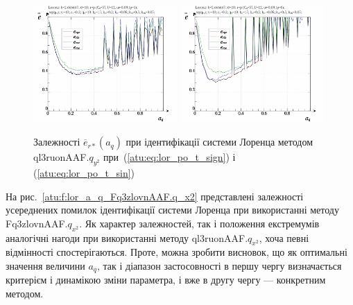 \begin{figure}[ht!]
  \centerline{
    \includegraphics[width=0.49\textwidth]{p/cha/lor/ql3ruonAAF/lor_ql3ruonAAF_qy2-p_a_q_e_sign.png}
    \hfill
    \includegraphics[width=0.49\textwidth]{p/cha/lor/ql3ruonAAF/lor_ql3ruonAAF_qy2-p_a_q_e_sin.png}
  }
\caption{Залежності $ \overline{e}_{r *} (a_q) $ при ідентифікації системи Лоренца методом ql3ruonAAF.$q_{y^2} $ при~(\ref{atu:eq:lor_po_t_sign}) і (\ref{atu:eq:lor_po_t_sin})}
  \label{atu:f:lor_a_q_ql3ruonAAF.q_y2}
\end{figure}


На рис.~\ref{atu:f:lor_a_q_Fq3zlovnAAF.q_x2} представлені залежності усереднених
помилок ідентифікації системи Лоренца при використанні методу
Fq3zlovnAAF.$q_{x^2}$.
Як характер залежностей, так і положення екстремумів аналогічні
нагоди при використанні методу
ql3ruonAAF.$q_{x^2}$,
хоча певні відмінності спостерігаються. Проте, можна зробити
висновок, що як оптимальні значення величини
$a_q$, так і діапазон застосовності в першу чергу визначається
критерієм і динамікою зміни параметра, і вже в другу чергу ---
конкретним методом.


